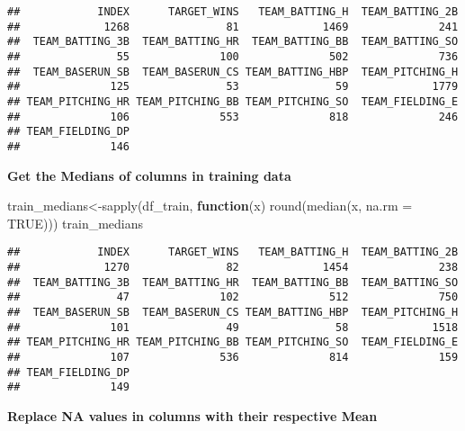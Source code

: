 \documentclass[
]{article}
\newenvironment{Shaded}{\begin{snugshade}}{\end{snugshade}}
\newcommand{\AttributeTok}[1]{\textcolor[rgb]{0.77,0.63,0.00}{#1}}
\newcommand{\ConstantTok}[1]{\textcolor[rgb]{0.00,0.00,0.00}{#1}}
\newcommand{\ControlFlowTok}[1]{\textcolor[rgb]{0.13,0.29,0.53}{\textbf{#1}}}
\newcommand{\FunctionTok}[1]{\textcolor[rgb]{0.00,0.00,0.00}{#1}}
\newcommand{\NormalTok}[1]{#1}
\newcommand{\OtherTok}[1]{\textcolor[rgb]{0.56,0.35,0.01}{#1}}
\begin{document}
\begin{verbatim}
##            INDEX      TARGET_WINS   TEAM_BATTING_H  TEAM_BATTING_2B 
##             1268               81             1469              241 
##  TEAM_BATTING_3B  TEAM_BATTING_HR  TEAM_BATTING_BB  TEAM_BATTING_SO 
##               55              100              502              736 
##  TEAM_BASERUN_SB  TEAM_BASERUN_CS TEAM_BATTING_HBP  TEAM_PITCHING_H 
##              125               53               59             1779 
## TEAM_PITCHING_HR TEAM_PITCHING_BB TEAM_PITCHING_SO  TEAM_FIELDING_E 
##              106              553              818              246 
## TEAM_FIELDING_DP 
##              146
\end{verbatim}

\textbf{Get the Medians of columns in training data}

\begin{Shaded}
\begin{Highlighting}[]
\NormalTok{train\_medians}\OtherTok{\textless{}{-}}\FunctionTok{sapply}\NormalTok{(df\_train, }\ControlFlowTok{function}\NormalTok{(x) }\FunctionTok{round}\NormalTok{(}\FunctionTok{median}\NormalTok{(x, }\AttributeTok{na.rm =} \ConstantTok{TRUE}\NormalTok{)))}
\NormalTok{train\_medians}
\end{Highlighting}
\end{Shaded}

\begin{verbatim}
##            INDEX      TARGET_WINS   TEAM_BATTING_H  TEAM_BATTING_2B 
##             1270               82             1454              238 
##  TEAM_BATTING_3B  TEAM_BATTING_HR  TEAM_BATTING_BB  TEAM_BATTING_SO 
##               47              102              512              750 
##  TEAM_BASERUN_SB  TEAM_BASERUN_CS TEAM_BATTING_HBP  TEAM_PITCHING_H 
##              101               49               58             1518 
## TEAM_PITCHING_HR TEAM_PITCHING_BB TEAM_PITCHING_SO  TEAM_FIELDING_E 
##              107              536              814              159 
## TEAM_FIELDING_DP 
##              149
\end{verbatim}

\textbf{Replace NA values in columns with their respective Mean}
\end{document}
